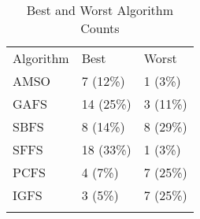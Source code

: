 \begin{table}
\caption{Best and Worst Algorithm Counts}
\label{tbl:best:worst:count}
\begin{tabular}{lll}
\noalign{\smallskip}\hline\noalign{\smallskip}
Algorithm&Best&Worst\\
\noalign{\smallskip}\hline
AMSO&7 (12\%)&1 (3\%)\\
GAFS&14 (25\%)&3 (11\%)\\
SBFS&8 (14\%)&8 (29\%)\\
SFFS&18 (33\%)&1 (3\%)\\
PCFS&4 (7\%)&7 (25\%)\\
IGFS&3 (5\%)&7 (25\%)\\
\noalign{\smallskip}\hline
\end{tabular}
\end{table}
